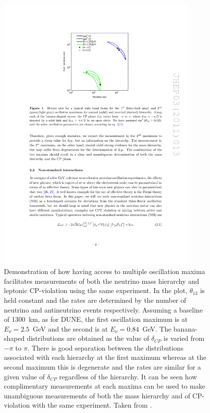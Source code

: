 \begin{figure}
  \centering
  \includegraphics[width=10cm]{TwoPeakAmbiguity.pdf}
  \caption[Demonstration of how having access to multiple oscillation maxima facilitates measurements of both the neutrino mass hierarchy and leptonic CP-violation using the same experiment.]{Demonstration of how having access to multiple oscillation maxima facilitates measurements of both the neutrino mass hierarchy and leptonic CP-violation using the same experiment.  In the plot, $\theta_{13}$ is held constant and the rates are determined by the number of neutrino and antineutrino events respectively.  Assuming a baseline of 1300~km, as for DUNE, the first oscillation maximum is at $E_{\nu}=2.5$~GeV and the second is at $E_{\nu}=0.84$~GeV.  The banana-shaped distributions are obtained as the value of $\delta_{CP}$ is varied from $-\pi$ to $\pi$.  There is good separation between the distributions associated with each hierarchy at the first maximum whereas at the second maximum this is degenerate and the rates are similar for a given value of $\delta_{CP}$ regardless of the hierarchy.  It can be seen how complimentary measurements at each maxima can be used to make unambiguous measurements of both the mass hierarchy and of CP-violation with the same experiment.  Taken from \cite{Huber2011}.}
  \label{fig:TwoPeakAmbiguity}
\end{figure}

